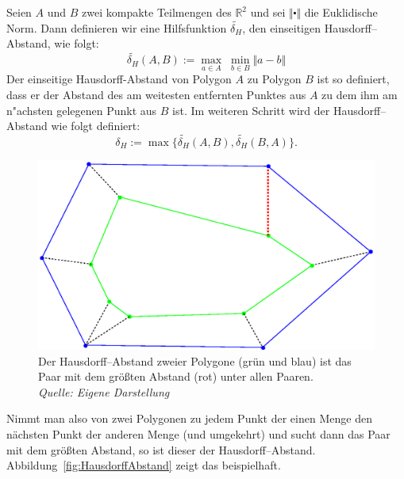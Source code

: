 Seien $A$ und $B$ zwei kompakte Teilmengen des $\mathbb{R}^2$ und sei $\Vert\centerdot\Vert$ die Euklidische Norm.
Dann definieren wir eine Hilfsfunktion $ \widetilde{\delta_H}  $, den einseitigen Hausdorff--Abstand, wie folgt:
\[ \widetilde{\delta_H}(A,B):=\max_{a\in A} \;\min_{b\in B} \Vert a-b \Vert\]
Der einseitige Hausdorff-Abstand von Polygon $A$ zu Polygon $B$ ist so definiert, dass er der Abstand des am weitesten entfernten Punktes aus $A$ zu dem ihm am n"achsten gelegenen Punkt aus $B$ ist.  Im weiteren Schritt wird der Hausdorff--Abstand wie folgt definiert: 
\[\delta_H:=\max\{\widetilde{\delta_H}(A,B),\widetilde{\delta_H}(B,A)\}.\]
\begin{figure}
	\centering
	\includegraphics[scale=.6]{Hausdorff.eps}
	\caption[Hausdorff--Abstand zweier Polygone]{Der Hausdorff--Abstand zweier Polygone (grün und blau) ist das Paar mit dem größten Abstand (rot) unter allen Paaren.\\\textit{Quelle: Eigene Darstellung}}
	\label{fig:HausdorffAbstand}
\end{figure}
Nimmt man also von zwei Polygonen zu jedem Punkt der einen Menge den nächsten Punkt der anderen Menge (und umgekehrt) und sucht dann das Paar mit dem größten Abstand, so ist dieser der Hausdorff--Abstand. Abbildung~\vref{fig:HausdorffAbstand} zeigt das beispielhaft.



